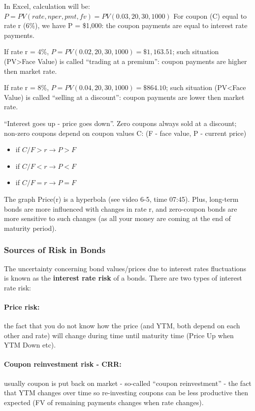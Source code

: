 \documentclass{scrartcl}
\begin{document}
In Excel, calculation will be: $P=PV(rate, nper, pmt, fv)= PV(0.03, 20, 30,
1000)$ For coupon (C) equal to rate r (6\%), we have P = \$1,000: the coupon
payments are equal to interest rate payments.

If rate r = 4\%, $P= PV(0.02, 20, 30, 1000)=\$1,163.51$; such situation (PV>Face
Value) is called ``trading at a premium'': coupon payments are higher then
market rate.

If rate r = 8\%, $P= PV(0.04, 20, 30, 1000)=\$864.10$; such situation (PV<Face
Value) is called ``selling at a discount'': coupon payments are lower then
market rate.

``Interest goes up - price goes down''. Zero coupons always sold at a discount;
non-zero coupons depend on coupon values C: (F - face value, P - current price)
\begin{itemize}
\item if $C/F > r \to P > F$
\item if $C/F < r \to P < F$
\item if $C/F = r \to P = F$
\end{itemize}

The graph Price(r) is a hyperbola (see video 6-5, time 07:45). Plus, long-term
bonds are more influenced with changes in rate r, and zero-coupon bonds are more
sensitive to such changes (as all your money are coming at the end of maturity
period).

\subsubsection{Sources of Risk in Bonds}
\label{sec:SourcesOfRiskBonds}

The uncertainty concerning bond values/prices due to interest rates fluctuations
is known as the {\bf interest rate risk} of a bonds. There are two types of
interest rate risk:
\paragraph{Price risk:} the fact that you do not know how the price (and YTM,
both depend on each other and rate) will change during time until maturity time
(Price Up when YTM Down etc).

\paragraph{Coupon reinvestment risk - CRR:} 
usually coupon is put back on market - so-called ``coupon reinvestment'' - the
fact that YTM changes over time so re-investing coupons can be less productive
then expected (FV of remaining payments changes when rate changes).
\end{document}
